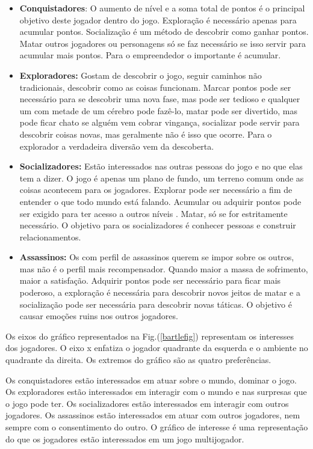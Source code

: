\begin{itemize}
\item  \textbf {Conquistadores}: O aumento de nível e a soma total de pontos é o principal objetivo deste jogador dentro do jogo. Exploração é necessário apenas para acumular pontos. Socialização é um método de descobrir como ganhar pontos. Matar outros jogadores ou personagens só se faz necessário se isso servir para acumular mais pontos. Para o empreendedor o importante é acumular.
\item  \textbf {Exploradores:}  Gostam de descobrir o jogo, seguir caminhos não tradicionais, descobrir como as coisas funcionam. Marcar pontos pode ser necessário para se descobrir uma nova fase, mas pode ser tedioso e qualquer um com metade de um cérebro pode fazê-lo, matar pode ser divertido, mas pode ficar chato se alguém vem cobrar vingança, socializar pode servir para descobrir coisas novas, mas geralmente não é isso que ocorre. Para o explorador a verdadeira diversão vem da descoberta.
\item  \textbf {Socializadores: } Estão interessados nas outras pessoas do jogo e no que elas tem a dizer. O jogo é apenas um plano de fundo, um terreno comum onde as coisas acontecem para os jogadores. Explorar pode ser necessário a fim de entender o que todo mundo está falando. Acumular ou adquirir pontos pode ser exigido para ter acesso a outros níveis . Matar, só se for estritamente necessário. O objetivo para os socializadores é conhecer pessoas e construir relacionamentos.
\item  \textbf{Assassinos:} Os com perfil de assassinos querem se impor sobre os outros, mas não é o perfil mais recompensador. Quando maior a massa de sofrimento, maior a satisfação. Adquirir pontos pode ser necessário para ficar mais poderoso, a exploração é necessária para descobrir novos jeitos de matar e a socialização pode ser necessária para descobrir novas táticas. O objetivo é causar emoções ruins nos outros jogadores.
\end{itemize}

\newpage

Os eixos do gráfico representados na Fig.(\ref{bartlefig}) representam os interesses dos jogadores. O eixo x enfatiza o jogador quadrante da esquerda e o ambiente no quadrante da direita. Os extremos do gráfico são as quatro preferências. 

Os conquistadores estão interessados em atuar sobre o mundo, dominar o jogo. Os exploradores estão interessados em interagir com o mundo e nas surpresas que o jogo pode ter. Os socializadores estão interessados em interagir com outros jogadores. Os assassinos estão interessados em atuar com outros jogadores, nem sempre com o consentimento do outro. O gráfico de interesse é uma representação do que os jogadores estão interessados em um jogo multijogador.

